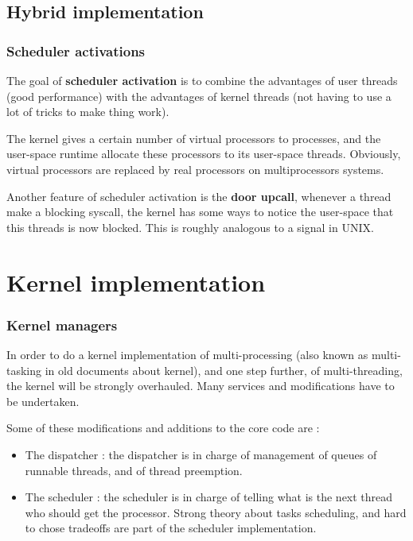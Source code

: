 \subsection{Hybrid implementation}

\begin{frame}
  \frametitle{Scheduler activations}

The goal of \textbf{scheduler activation} is to combine the advantages of user threads (good performance) with the advantages of kernel threads (not having to use a lot of tricks to make thing work).

\-

The kernel gives a certain number of virtual processors to processes, and the user-space runtime allocate these processors to its user-space threads. Obviously, virtual processors are replaced by real processors on multiprocessors systems.

\-

Another feature of scheduler activation is the \textbf{door upcall}, whenever a thread make a blocking syscall, the kernel has some ways to notice the user-space that this threads is now blocked. This is roughly analogous to a signal in UNIX.

\end{frame}


%
%

\section{Kernel implementation}


\begin{frame}
  \frametitle{Kernel managers}

In order to do a kernel implementation of multi-processing (also known as multi-tasking in old documents about kernel), and one step further, of multi-threading, the kernel will be strongly overhauled. Many services and modifications have to be undertaken.

\-

Some of these modifications and additions to the core code are :

\begin{itemize}
\item
The dispatcher : the dispatcher is in charge of management of queues of runnable threads, and of thread preemption.

\item
The scheduler : the scheduler is in charge of telling what is the next thread who should get the processor. Strong theory about tasks scheduling, and hard to chose tradeoffs are part of the scheduler implementation.

\end{itemize}

\end{frame}


